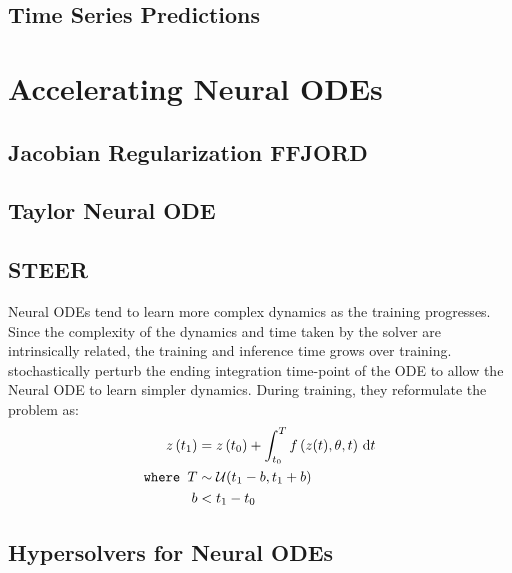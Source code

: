 \subsection{Time Series Predictions}
\label{subsec:time_series_predictions}

\section{Accelerating Neural ODEs}
\label{sec:accelerating_neural_odes_prior_works}

\subsection{Jacobian Regularization FFJORD}

\subsection{Taylor Neural ODE}

\subsection{STEER}
\label{subsec:steer}


Neural ODEs tend to learn more complex dynamics as the training progresses. Since the complexity of the dynamics and time taken by the solver are intrinsically related, the training and inference time grows over training. \citet{ghosh2020steer} stochastically perturb the ending integration time-point of the ODE to allow the Neural ODE to learn simpler dynamics. During training, they reformulate the problem as:
%
\begin{align}
  z\left(t_1\right)      & = z\left(t_0\right) + \int_{t_0}^{T} f\left(z(t), \theta, t\right) \, \mathrm{d}t \\
  \texttt{where } T  & \sim \mathcal{U}(t_1 - b, t_1 + b)                                \\
  \phantom{where } b & < t_1 - t_0
\end{align}
%


\subsection{Hypersolvers for Neural ODEs}
